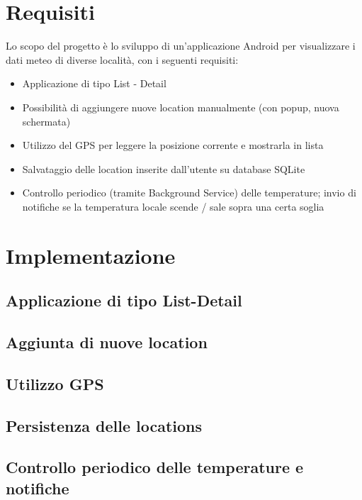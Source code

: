 \documentclass[twoside]{supsistudent}
\begin{document}
\maketitle
\onehalfspacing
\frontmatter


\tableofcontents


\newpage
\mainmatter
{}
\setcounter{page}{1}

\chapter{Requisiti}
Lo scopo del progetto è lo sviluppo di un'applicazione Android per visualizzare i dati meteo di diverse località, con i seguenti requisiti:
\begin{itemize}
\item Applicazione di tipo List - Detail
\item Possibilità di aggiungere nuove location manualmente (con popup, nuova schermata)
\item Utilizzo del GPS per leggere la posizione corrente e mostrarla in lista
\item Salvataggio delle location inserite dall'utente su database SQLite
\item Controllo periodico (tramite Background Service) delle temperature; invio di notifiche se la temperatura locale scende / sale sopra una certa soglia
\end{itemize}


\chapter{Implementazione}


\section{Applicazione di tipo List-Detail}
\lipsum[13]


\section{Aggiunta di nuove location}
\lipsum[13]

\section{Utilizzo GPS}
\lipsum[13]

\section{Persistenza delle locations}
\lipsum[13]

\section{Controllo periodico delle temperature e notifiche}
\lipsum[13]
\end{document}
